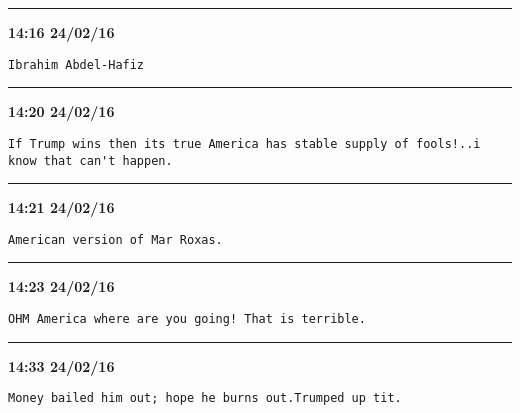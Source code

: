 \hrule%

\begin{adjustwidth}{0cm}{0cm}
\footnotesize \textbf{14:16 24/02/16}

\begin{lstlisting}[breaklines, breakatwhitespace, basicstyle=\small, frame=leftline]
Ibrahim Abdel-Hafiz
\end{lstlisting}
\end{adjustwidth}

\hrule%

\begin{adjustwidth}{0cm}{0cm}
\footnotesize \textbf{14:20 24/02/16}

\begin{lstlisting}[breaklines, breakatwhitespace, basicstyle=\small, frame=leftline]
If Trump wins then its true America has stable supply of fools!..i know that can't happen.
\end{lstlisting}
\end{adjustwidth}

\hrule%

\begin{adjustwidth}{0cm}{0cm}
\footnotesize \textbf{14:21 24/02/16}

\begin{lstlisting}[breaklines, breakatwhitespace, basicstyle=\small, frame=leftline]
American version of Mar Roxas.
\end{lstlisting}
\end{adjustwidth}

\hrule%

\begin{adjustwidth}{0cm}{0cm}
\footnotesize \textbf{14:23 24/02/16}

\begin{lstlisting}[breaklines, breakatwhitespace, basicstyle=\small, frame=leftline]
OHM America where are you going! That is terrible.
\end{lstlisting}
\end{adjustwidth}

\hrule%

\begin{adjustwidth}{0cm}{0cm}
\footnotesize \textbf{14:33 24/02/16}

\begin{lstlisting}[breaklines, breakatwhitespace, basicstyle=\small, frame=leftline]
Money bailed him out; hope he burns out.Trumped up tit.
\end{lstlisting}
\end{adjustwidth}


